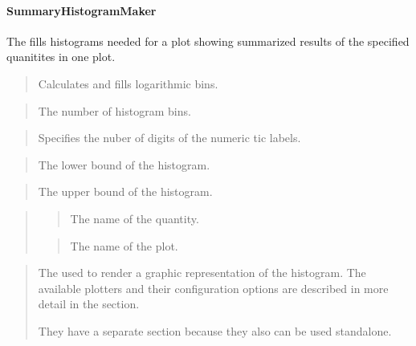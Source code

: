 \documentclass[letterpaper,10pt,english]{sphinxmanual}
\begin{document}
\paragraph{SummaryHistogramMaker}
\label{summary_histogrammaker::doc}\label{summary_histogrammaker:summaryhistogrammaker}
The  fills histograms needed for a plot showing summarized results of the
specified quanitites in one plot.

\begin{quote}

Calculates and fills logarithmic bins.
\end{quote}

\begin{quote}

The number of histogram bins.
\end{quote}



\begin{quote}

Specifies the nuber of digits of the numeric tic labels.
\end{quote}

\begin{quote}

The lower bound of the histogram.
\end{quote}

\begin{quote}

The upper bound of the histogram.
\end{quote}

\begin{quote}

\begin{quote}

The name of the quantity.
\end{quote}

\begin{quote}

The name of the plot.
\end{quote}
\end{quote}

\begin{quote}

The  used to render a graphic representation of the histogram. The available plotters
and their configuration options are described in more detail in the section.

They have a separate section because they also can be used standalone.
\end{quote}
\end{document}
